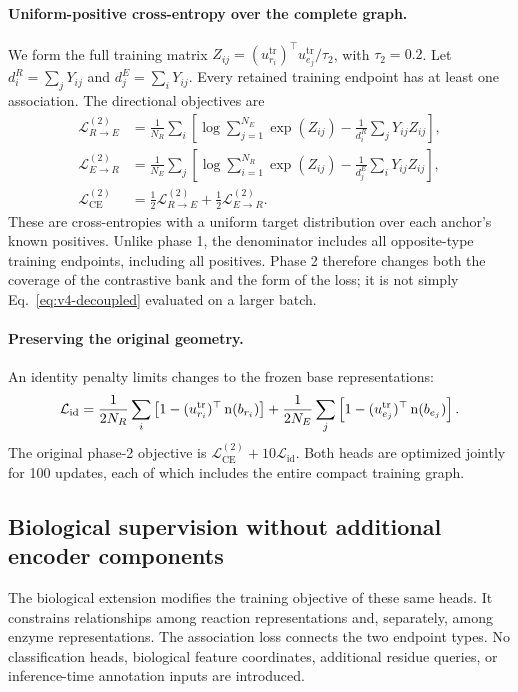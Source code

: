\paragraph{Uniform-positive cross-entropy over the complete graph.}
We form the full training matrix $Z_{ij}=(u_{r_i}^{\mathrm{tr}})^\top
u_{e_j}^{\mathrm{tr}}/\tau_2$, with $\tau_2=0.2$. Let
$d_i^R=\sum_jY_{ij}$ and $d_j^E=\sum_iY_{ij}$. Every retained training
endpoint has at least one association. The directional objectives are
\begin{align}
  \mathcal L_{R\to E}^{(2)}
    &=\frac{1}{N_R}\sum_i\left[
       \log\sum_{j=1}^{N_E}\exp(Z_{ij})
       -\frac{1}{d_i^R}\sum_jY_{ij}Z_{ij}\right],\\
  \mathcal L_{E\to R}^{(2)}
    &=\frac{1}{N_E}\sum_j\left[
       \log\sum_{i=1}^{N_R}\exp(Z_{ij})
       -\frac{1}{d_j^E}\sum_iY_{ij}Z_{ij}\right],\\
  \mathcal L_{\mathrm{CE}}^{(2)}
    &=\tfrac12\mathcal L_{R\to E}^{(2)}+
      \tfrac12\mathcal L_{E\to R}^{(2)}.
  \label{eq:v4-fullgraph}
\end{align}
These are cross-entropies with a uniform target distribution over each
anchor's known positives. Unlike phase 1, the denominator includes all
opposite-type training endpoints, including all positives. Phase 2 therefore
changes both the coverage of the contrastive bank and the form of the loss;
it is not simply Eq.~\eqref{eq:v4-decoupled} evaluated on a larger batch.

\paragraph{Preserving the original geometry.}
An identity penalty limits changes to the frozen base representations:
\begin{equation}
  \mathcal L_{\mathrm{id}}=
  \frac{1}{2N_R}\sum_i\left[1-(u_{r_i}^{\mathrm{tr}})^\top\operatorname{n}(b_{r_i})\right]
  +\frac{1}{2N_E}\sum_j\left[1-(u_{e_j}^{\mathrm{tr}})^\top\operatorname{n}(b_{e_j})\right].
  \label{eq:v4-identity}
\end{equation}
The original \methodname phase-2 objective is
$\mathcal L_{\mathrm{CE}}^{(2)}+10\mathcal L_{\mathrm{id}}$.
Both heads are optimized jointly for 100 updates, each of which includes the
entire compact training graph.

\subsection{Biological supervision without additional encoder components}
\label{sec:v4-biology}
The biological extension modifies the training objective of these same heads.
It constrains relationships among reaction representations and, separately,
among enzyme representations. The association loss connects the two endpoint
types. No classification heads, biological feature coordinates, additional
residue queries, or inference-time annotation inputs are introduced.

